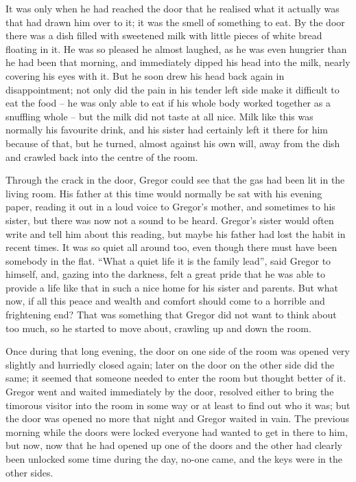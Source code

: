It was only when he had reached the door that he realised what it
actually was that had drawn him over to it; it was the smell of
something to eat. By the door there was a dish filled with sweetened
milk with little pieces of white bread floating in it. He was so
pleased he almost laughed, as he was even hungrier than he had been
that morning, and immediately dipped his head into the milk, nearly
covering his eyes with it. But he soon drew his head back again in
disappointment; not only did the pain in his tender left side make it
difficult to eat the food – he was only able to eat if his whole body
worked together as a snuffling whole – but the milk did not taste at all
nice. Milk like this was normally his favourite drink, and his sister
had certainly left it there for him because of that, but he turned,
almost against his own will, away from the dish and crawled back into
the centre of the room.

Through the crack in the door, Gregor could see that the gas had been
lit in the living room. His father at this time would normally be sat
with his evening paper, reading it out in a loud voice to Gregor’s
mother, and sometimes to his sister, but there was now not a sound to
be heard. Gregor’s sister would often write and tell him about this
reading, but maybe his father had lost the habit in recent times. It
was so quiet all around too, even though there must have been somebody
in the flat. “What a quiet life it is the family lead”, said Gregor to
himself, and, gazing into the darkness, felt a great pride that he was
able to provide a life like that in such a nice home for his sister and
parents. But what now, if all this peace and wealth and comfort should
come to a horrible and frightening end? That was something that Gregor
did not want to think about too much, so he started to move about,
crawling up and down the room.

Once during that long evening, the door on one side of the room was
opened very slightly and hurriedly closed again; later on the door on
the other side did the same; it seemed that someone needed to enter the
room but thought better of it. Gregor went and waited immediately by
the door, resolved either to bring the timorous visitor into the room
in some way or at least to find out who it was; but the door was opened
no more that night and Gregor waited in vain. The previous morning
while the doors were locked everyone had wanted to get in there to him,
but now, now that he had opened up one of the doors and the other had
clearly been unlocked some time during the day, no-one came, and the
keys were in the other sides.


